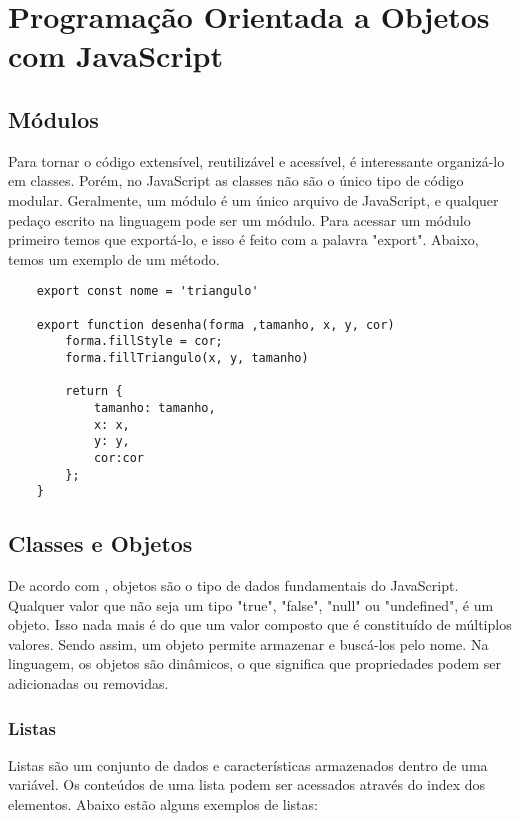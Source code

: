 

\chapter{ Programa\c{c}\~{a}o Orientada a Objetos com JavaScript}


	\section{Módulos}
	Para tornar o código extensível, reutilizável e acessível, é interessante organizá-lo em classes. Porém, no JavaScript as classes não são o único tipo de código modular. Geralmente, um módulo é um único arquivo de JavaScript, e qualquer pedaço escrito na linguagem pode ser um módulo.
	Para acessar um módulo primeiro temos que exportá-lo, e isso é feito com a palavra "export". Abaixo, temos um exemplo de um método.
	
	\begin{lstlisting}
	export const nome = 'triangulo'
	
	export function desenha(forma ,tamanho, x, y, cor)
		forma.fillStyle = cor;
		forma.fillTriangulo(x, y, tamanho)
		
		return {
			tamanho: tamanho,
			x: x,
			y: y,
			cor:cor
		};
	}
	\end{lstlisting}
    \section{Classes e Objetos}
De acordo com \cite{flanagan2020javascript}, objetos são o tipo de dados fundamentais do JavaScript. Qualquer valor que não seja um tipo "true", "false", "null" ou "undefined", é um objeto. Isso nada mais é do que um valor composto que é constituído de múltiplos valores. Sendo assim, um objeto permite armazenar e buscá-los pelo nome. Na linguagem, os objetos são dinâmicos, o que significa que propriedades podem ser adicionadas ou removidas. 


\subsection{Listas}
Listas são um conjunto de dados e características armazenados dentro de uma variável. Os conteúdos de uma lista podem ser acessados através do index dos elementos. Abaixo estão alguns exemplos de listas: \newline

